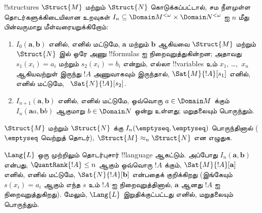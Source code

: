 \documentclass[../../../include/open-logic-section]{subfiles}
\begin{document}
\begin{defn}
  !!{structure}s $\Struct{M}$ மற்றும் $\Struct{N}$ கொடுக்கப்பட்டால்,
  சம நீளமுள்ள தொடர்களுக்கிடையிலான உறவுகள்
  $I_n \subseteq \Domain M^{<\omega} \times \Domain N^{<\omega}$ ஐ
  $n$ மீது பின்வருமாறு மீள்வரையறுக்கிறோம்:
   \begin{enumerate}
   \item $I_0(\mathbf{a},\mathbf{b})$ எனில், எனில் மட்டுமே,
     $\mathbf{a}$ மற்றும் $\mathbf{b}$ ஆகியவை $\Struct{M}$ மற்றும்
     $\Struct{N}$ இல் ஒரே அணு !!{formula}s ஐ நிறைவுறுத்துகின்றன;
     அதாவது $s_1(x_i) = a_i$ மற்றும் $s_2(x_i) =
     b_i$ என்றும், எல்லா !!{variable}s உம்
     $x_1$, \dots,~$x_n$ ஆகியவற்றுள் இருந்து $!A$ அணுவாகவும் இருந்தால்,
     $\Sat{M}{!A}[s_1]$ எனில், எனில் மட்டுமே,
     ~$\Sat{N}{!A}[s_2]$.
   \item $I_{n+1} (\mathbf{a},\mathbf{b})$ எனில், எனில் மட்டுமே,
     ஒவ்வொரு $a\in \Domain M$ க்கும் $I_n
     (\mathbf{a}a,\mathbf{b}b)$ ஆகுமாறு $b\in \Domain N$ ஒன்று
     உள்ளது; மறுதலையும் பொருந்தும்.
   \end{enumerate}
\end{defn}


\begin{defn}
  $\Struct{M}$ மற்றும் $\Struct{N}$ க்கு
  $I_n(\emptyseq,\emptyseq)$ பொருந்தினால் ($\emptyseq$ வெற்றுத் தொடர்),
  $\Struct{M} \approx_n \Struct{N}$ என எழுதுக.
\end{defn}

\begin{thm}
  $\Lang{L}$ ஒரு முற்றிலும் தொடர்புசார் !!{language} ஆகட்டும். அப்போது
  $I_n
  (\mathbf{a},\mathbf{b})$ என்பது, $\QuantRank{!A} \le n$ ஆகும்
  ஒவ்வொரு $!A$ க்கும், $\Sat{M}{!A}[\mathbf{a}]$ எனில், எனில் மட்டுமே,
  $\Sat{N}{!A}[\mathbf{b}]$ என்பதைக் குறிக்கிறது (இங்கேயும்
  $s(x_i) = a_i$ ஆகும் எந்த $s$ உம் $!A$ ஐ நிறைவுறுத்தினால்,
  $\mathbf{a}$ ஆனது $!A$ ஐ நிறைவுறுத்துகிறது). மேலும்,
  $\Lang{L}$ இறுதிக்குட்பட்டது எனில், மறுதலையும் பொருந்தும்.
\end{thm}
\end{document}
